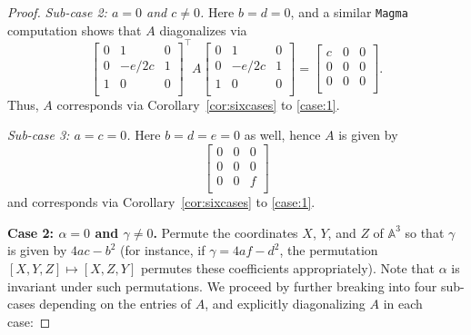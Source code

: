 \documentclass[10pt,a4paper]{amsart}
\numberwithin{equation}{section}
\numberwithin{figure}{section}
\numberwithin{table}{section}
\theoremstyle{definition}
\theoremstyle{plain}
\theoremstyle{remark}
\theoremstyle{plain}
\theoremstyle{definition}
\theoremstyle{plain}
\theoremstyle{plain}
\newcommand{\A}{\mathbb{A}}
\begin{document}
\begin{proof}
\emph{Sub-case 2: $a=0$ and $c\ne 0$.}  Here $b=d=0$, and a similar \texttt{Magma} computation shows that $A$ diagonalizes via
\begin{equation*}
\begin{bmatrix}
0&1&0\\
0&-e/2c&1\\
1&0&0\\
\end{bmatrix}^\top\!
A
\begin{bmatrix}
0&1&0\\
0&-e/2c&1\\
1&0&0\\
\end{bmatrix}
=
\begin{bmatrix}
c&0&0\\
0&0&0\\
0&0&0\\
\end{bmatrix}.
\end{equation*}
Thus, $A$ corresponds via Corollary~\ref{cor:sixcases} to \eqref{case:1}.

\emph{Sub-case 3: $a=c=0$.} Here $b=d=e=0$ as well, hence $A$ is given by
\begin{equation*}
\begin{bmatrix}
0&0&0\\
0&0&0\\
0&0&f\\
\end{bmatrix}
\end{equation*}
and corresponds via Corollary~\ref{cor:sixcases} to \eqref{case:1}.

		\textbf{Case 2: $\alpha=0$ and $\gamma\ne 0$.} Permute the coordinates $X$, $Y$, and $Z$ of $\A^3$ so that $\gamma$ is given by $4ac-b^2$ (for instance, if $\gamma=4af-d^2$, the permutation $[X,Y,Z]\mapsto[X,Z,Y]$ permutes these coefficients appropriately). Note that $\alpha$ is invariant under such permutations. We proceed by further breaking into four sub-cases depending on the entries of $A$, and explicitly diagonalizing $A$ in each case:


\end{proof}
\end{document}
